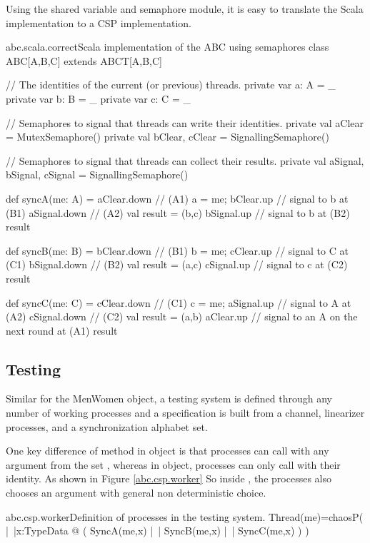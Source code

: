 \documentclass{article}
\begin{document}
Using the shared variable and semaphore module, it is easy to translate the Scala implementation to a CSP implementation.

\begin{scalafloat}{abc.scala.correct}{Scala implementation of the ABC using semaphores}
class ABC[A,B,C] extends ABCT[A,B,C]{
  // The identities of the current (or previous) threads.
  private var a: A = _
  private var b: B = _
  private var c: C = _

  // Semaphores to signal that threads can write their identities.
  private val aClear = MutexSemaphore()
  private val bClear, cClear = SignallingSemaphore()

  // Semaphores to signal that threads can collect their results. 
  private val aSignal, bSignal, cSignal = SignallingSemaphore()

  def syncA(me: A) = {
    aClear.down         // (A1)
    a = me; bClear.up   // signal to b at (B1)
    aSignal.down        // (A2)
    val result = (b,c)
    bSignal.up          // signal to b at (B2)
    result
  }

  def syncB(me: B) = {
    bClear.down         // (B1)
    b = me; cClear.up   // signal to C at (C1)
    bSignal.down        // (B2)
    val result = (a,c)
    cSignal.up          // signal to c at (C2)
    result
  }

  def syncC(me: C) = {
    cClear.down         // (C1)
    c = me; aSignal.up  // signal to A at (A2)
    cSignal.down        // (C2)
    val result = (a,b)
    aClear.up           // signal to an A on the next round at (A1)
    result
  }
}      
\end{scalafloat}
\subsection{Testing}
Similar for the MenWomen object, a testing system is defined through any number of working processes and a specification is built from a  channel, linearizer processes, and a synchronization alphabet set. 

One key difference of method in  object is that processes can call with any argument from the set , whereas in  object, processes can only call with their identity. As shown in Figure \ref{abc.csp.worker} So inside , the processes also chooses an argument with general non deterministic choice. 

\begin{cspinline}{abc.csp.worker}{Definition of processes in the testing system.}
Thread(me)=chaosP(
  |~|x:TypeData @ (
        SyncA(me,x) 
    |~| SyncB(me,x) 
    |~| SyncC(me,x)
  )
)
\end{cspinline}
\end{document}
